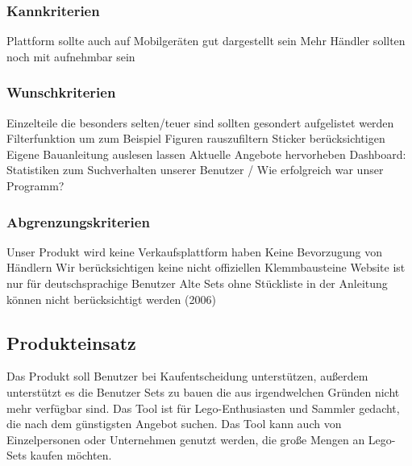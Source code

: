 \subsubsection{Kannkriterien}
Plattform sollte auch auf Mobilgeräten gut dargestellt sein  \newline
Mehr Händler sollten noch mit aufnehmbar sein  \newline

\subsubsection{Wunschkriterien}
Einzelteile die besonders selten/teuer sind sollten gesondert aufgelistet werden \newline
Filterfunktion um zum Beispiel Figuren rauszufiltern \newline
Sticker berücksichtigen \newline
Eigene Bauanleitung auslesen lassen \newline
Aktuelle Angebote hervorheben \newline
Dashboard: Statistiken zum Suchverhalten unserer Benutzer / Wie erfolgreich war unser Programm? \newline

\subsubsection{Abgrenzungskriterien}
Unser Produkt wird keine Verkaufsplattform haben  \newline
Keine Bevorzugung von Händlern \newline
Wir berücksichtigen keine nicht offiziellen Klemmbausteine \newline
Website ist nur für deutschsprachige Benutzer \newline
Alte Sets ohne Stückliste in der Anleitung können nicht berücksichtigt werden (2006) \newline

\subsection{Produkteinsatz}
 Das Produkt soll Benutzer bei Kaufentscheidung unterstützen, außerdem unterstützt es die Benutzer Sets zu bauen die aus irgendwelchen Gründen nicht mehr verfügbar sind.\newline
Das Tool ist für Lego-Enthusiasten und Sammler gedacht, die nach dem günstigsten Angebot suchen. Das Tool kann auch von Einzelpersonen oder Unternehmen genutzt werden, die große Mengen an Lego-Sets kaufen möchten. \newline

